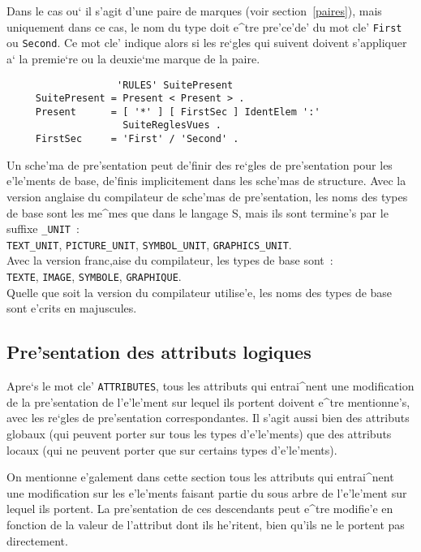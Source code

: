 {Dans le cas ou` il s'agit d'une paire de marques (voir section~\ref{paires}),
mais uniquement dans ce cas, le nom du type doit e^tre pre'ce'de' du mot cle'
{\tt First} ou {\tt Second}. Ce mot cle' indique alors si les re`gles qui
suivent doivent s'appliquer a` la premie`re ou la deuxie`me marque de la paire.

\begin{verbatim}
                   'RULES' SuitePresent
     SuitePresent = Present < Present > .
     Present      = [ '*' ] [ FirstSec ] IdentElem ':'
                    SuiteReglesVues .
     FirstSec     = 'First' / 'Second' .
\end{verbatim}

Un sche'ma de pre'sentation peut de'finir des re`gles de pre'sentation pour
les e'le'ments de base, de'finis implicitement dans les sche'mas de structure.
Avec la version anglaise du compilateur de sche'mas de pre'sentation,
les noms des types de base sont les me^mes que dans le langage S, mais ils
sont termine's par le suffixe {\tt \_UNIT}~: \\
{\tt TEXT\_UNIT}, {\tt PICTURE\_UNIT}, {\tt SYMBOL\_UNIT},
{\tt GRAPHICS\_UNIT}. \\
Avec la version franc,aise du compilateur, les types de base sont~: \\
{\tt TEXTE}, {\tt IMAGE}, {\tt SYMBOLE}, {\tt GRAPHIQUE}. \\
Quelle que soit la version du compilateur utilise'e, les noms des types de
base sont e'crits en majuscules.

\subsection{Pre'sentation des attributs logiques}
\label{presattributs}

Apre`s le mot cle' {\tt ATTRIBUTES}, tous les attributs qui entrai^nent une
modification de la pre'sentation de l'e'le'ment sur lequel ils portent doivent
e^tre mentionne's, avec les re`gles de pre'sentation correspondantes. Il s'agit
aussi bien des attributs globaux (qui peuvent porter sur tous les types
d'e'le'ments) que des attributs locaux (qui ne peuvent porter que sur certains
types d'e'le'ments).

On mentionne e'galement dans cette section tous les attributs
qui entrai^nent une modification sur les e'le'ments faisant partie du
sous arbre de l'e'le'ment sur lequel ils portent. La pre'sentation de
ces descendants peut e^tre modifie'e en fonction de la valeur de
l'attribut dont ils he'ritent, bien qu'ils ne le portent pas directement.

}
